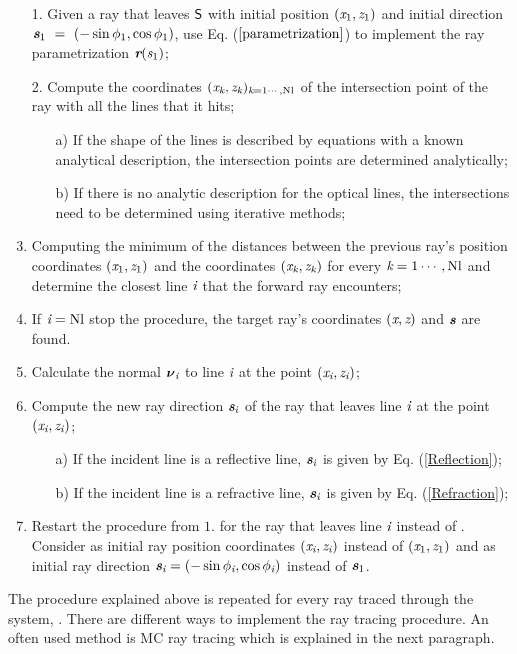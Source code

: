 \begin{enumerate}
 \item[1. ] Given a ray that leaves $\textsf{S}$ with initial position $(\textit{x}_1, \textit{z}_1)$ and initial direction $\textit{\textbf{s}}_1~=~(-\sin \phi_1, \cos \phi_1)$, use Eq. ($\ref{parametrization}$) to implement the ray parametrization $\textit{\textbf{r}}(\textit{s}_1)$;
\item[2. ] Compute the coordinates $(\textit{x}_{\textit{k}}, \textit{z}_{\textit{k}})_{\textit{k} = 1\cdots, \textrm{Nl}}$ of the intersection point of the ray with all the lines that it hits;
\begin{itemize}
\item[a)] If the shape of the lines is described by equations with a known analytical description, the intersection points are determined analytically;
\item[b)] If there is no analytic description for the optical lines, the intersections need to be determined using iterative methods;
\end{itemize}
\item  Computing the minimum of the distances between the previous ray's position coordinates $(\textit{x}_1, \textit{z}_1)$ and the coordinates $(\textit{x}_{\textit{k}}, \textit{z}_{\textit{k}})$ for every ${\textit{k} = 1\cdots, \textrm{Nl}}$ and determine the closest line $\textit{i}$ that the forward ray encounters;
\item If $\textit{i} = \textrm{Nl}$ stop the procedure, the target ray's coordinates $(\textit{x}, \textit{z})$ and $\textit{\textbf{s}}$ are found.
\item Calculate the normal $\boldsymbol{\nu}_{\textit{i}}$ to line $\textit{i}$ at the point $(\textit{x}_{\textit{i}}, \textit{z}_{\textit{i}})$;
 \item Compute the new ray direction $\textit{\textbf{s}}_{\textit{i}}$ of the ray that leaves line $\textit{i}$ at the point $(\textit{x}_{\textit{i}}, \textit{z}_{\textit{i}})$;
\begin{itemize}
\item[a)] If the incident line is a reflective line, $\textit{\textbf{s}}_{\textit{i}}$ is given by Eq. (\ref{Reflection});
\item[b)] If the incident line is a refractive line, $\textit{\textbf{s}}_{\textit{i}}$ is given by Eq. (\ref{Refraction});
\end{itemize}
\item Restart the procedure from $1.$ for the ray that leaves line $\textit{i}$ instead of . Consider as initial ray position coordinates $(\textit{x}_{\textit{i}}, \textit{z}_{\textit{i}})$ instead of $(\textit{x}_1, \textit{z}_1)$ and as initial ray direction $\textit{\textbf{s}}_{\textit{i}}= (-\sin \phi_{\textit{i}}, \cos \phi_{\textit{i}})$ instead of $\textit{\textbf{s}}_1$.
\end{enumerate}
The procedure explained above is repeated for every ray traced through the system, \cite{Gross2005Handbook}. There are different ways to implement the ray tracing procedure.
An often used method is MC ray tracing which is explained in the next paragraph.
